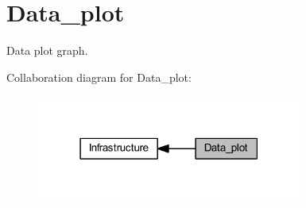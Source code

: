 \section{Data\+\_\+plot}
\label{group___data__plot}


Data plot graph.  


Collaboration diagram for Data\+\_\+plot\+:
\nopagebreak
\begin{figure}[H]
\begin{center}
\leavevmode
\includegraphics[width=247pt]{group___data__plot}
\end{center}
\end{figure}
